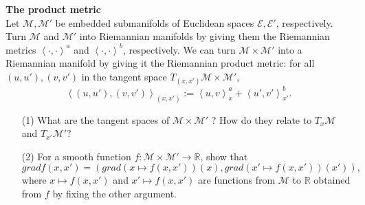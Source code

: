 \documentclass[en, oneside]{assignment}
\begin{document}
\begin{prob} \textbf{The product metric}\\
    Let $\mathcal{M}, \mathcal{M}'$ be embedded submanifolds of Euclidean spaces $\mathcal{E}, \mathcal{E}'$, respectively.\\
    Turn $\mathcal{M}$ and $\mathcal{M}'$ into Riemannian manifolds by giving them the Riemannian metrics 
    $\left\langle \cdot, \cdot \right\rangle^a$ and $\left\langle \cdot, \cdot \right\rangle^b$, respectively. 
    We can turn $\mathcal{M} \times \mathcal{M}'$ into a Riemannian manifold by giving it the Riemannian product metric:
    for all $(u, u'), (v, v')$ in the tangent space $T_{(x, x')}\mathcal{M} \times \mathcal{M}'$,
    \begin{equation*}
        \left\langle (u, u'), (v, v') \right\rangle _{(x, x')} := \left\langle u, v \right\rangle^a_x + \left\langle u', v' \right\rangle^b_{x'}.
    \end{equation*}
    \begin{itemize}
        \item[(1)] What are the tangent spaces of $\mathcal{M} \times \mathcal{M}'$ ? How do they relate to $T_x \mathcal{M}$ and $T_{x'} \mathcal{M}'$?
        \item[(2)] For a smooth function $f: \mathcal{M} \times \mathcal{M}' \rightarrow \mathbb{R}$, show that
        \begin{equation*}
            grad f(x, x') = (grad(x \mapsto f(x, x'))(x), grad(x' \mapsto f(x, x'))(x')),
        \end{equation*}
        where $x \mapsto f(x, x')$ and $x' \mapsto f(x, x')$ are functions from $\mathcal{M}$ to $\mathbb{R}$ obtained from $f$ by fixing the other argument.
    \end{itemize}
\end{prob}
\end{document}

